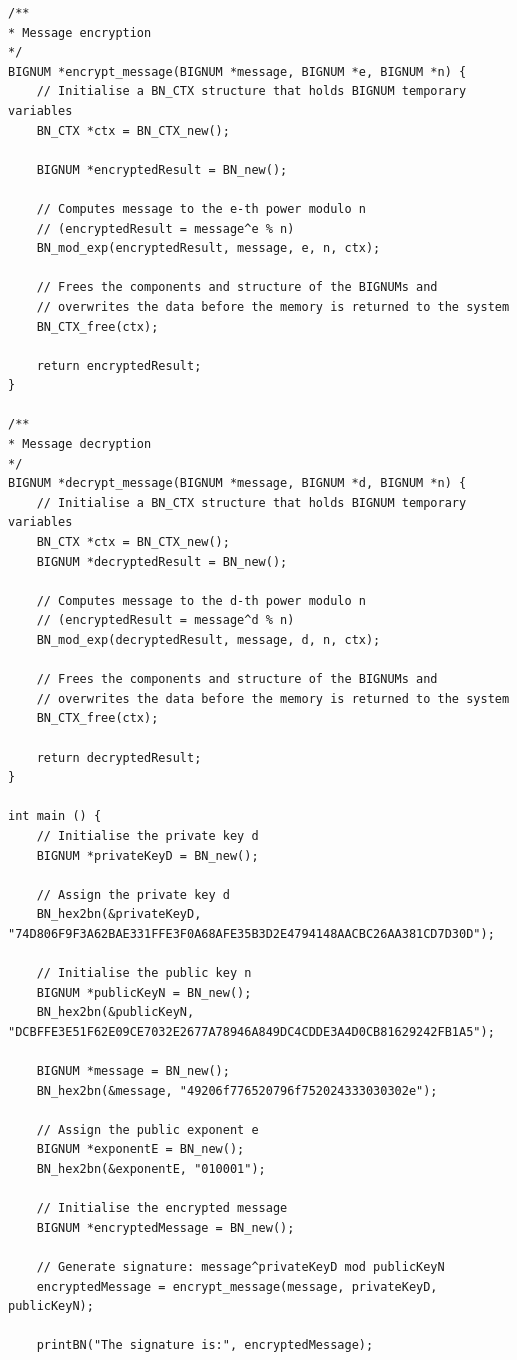 \documentclass[12pt]{article}
\begin{document}
\begin{lstlisting}
/**
* Message encryption
*/ 
BIGNUM *encrypt_message(BIGNUM *message, BIGNUM *e, BIGNUM *n) {
    // Initialise a BN_CTX structure that holds BIGNUM temporary variables
    BN_CTX *ctx = BN_CTX_new();
    
    BIGNUM *encryptedResult = BN_new();

    // Computes message to the e-th power modulo n
    // (encryptedResult = message^e % n)
    BN_mod_exp(encryptedResult, message, e, n, ctx);

    // Frees the components and structure of the BIGNUMs and
    // overwrites the data before the memory is returned to the system
    BN_CTX_free(ctx);

    return encryptedResult;
}

/**
* Message decryption
*/
BIGNUM *decrypt_message(BIGNUM *message, BIGNUM *d, BIGNUM *n) {
    // Initialise a BN_CTX structure that holds BIGNUM temporary variables
    BN_CTX *ctx = BN_CTX_new();
    BIGNUM *decryptedResult = BN_new();

    // Computes message to the d-th power modulo n
    // (encryptedResult = message^d % n)
    BN_mod_exp(decryptedResult, message, d, n, ctx);

    // Frees the components and structure of the BIGNUMs and
    // overwrites the data before the memory is returned to the system
    BN_CTX_free(ctx);

    return decryptedResult;
}

int main () {
    // Initialise the private key d
    BIGNUM *privateKeyD = BN_new();

    // Assign the private key d
    BN_hex2bn(&privateKeyD, "74D806F9F3A62BAE331FFE3F0A68AFE35B3D2E4794148AACBC26AA381CD7D30D");

    // Initialise the public key n
    BIGNUM *publicKeyN = BN_new();
    BN_hex2bn(&publicKeyN, "DCBFFE3E51F62E09CE7032E2677A78946A849DC4CDDE3A4D0CB81629242FB1A5");

    BIGNUM *message = BN_new();
    BN_hex2bn(&message, "49206f776520796f752024333030302e");

    // Assign the public exponent e
    BIGNUM *exponentE = BN_new();
    BN_hex2bn(&exponentE, "010001");

    // Initialise the encrypted message
    BIGNUM *encryptedMessage = BN_new();

    // Generate signature: message^privateKeyD mod publicKeyN
    encryptedMessage = encrypt_message(message, privateKeyD, publicKeyN);

    printBN("The signature is:", encryptedMessage);


\end{lstlisting}
\end{document}
